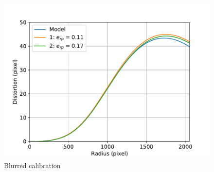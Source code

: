 \begin{figure}[ht]
	\centering
	\includegraphics[width=0.9\linewidth]{3-development/calibration/images/blurred.pdf}
	\caption{Blurred calibration\label{development:blurred}}
\end{figure}
